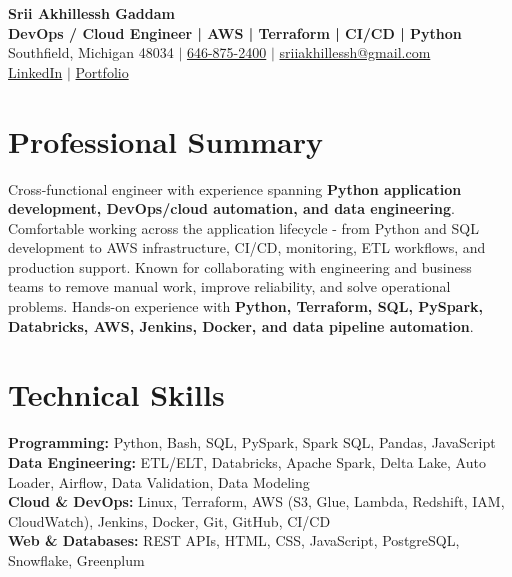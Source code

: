 \documentclass[letterpaper,10pt]{article}
\begin{document}
\fontsize{9.35pt}{10.45pt}\selectfont

\begin{center}
    {\LARGE \textbf{Srii Akhillessh Gaddam}} \\[-1pt]
    \textbf{DevOps / Cloud Engineer | AWS | Terraform | CI/CD | Python} \\[2pt]
    Southfield, Michigan 48034 $|$
    \href{tel:6468752400}{646-875-2400} $|$
    \href{mailto:sriiakhillessh@gmail.com}{sriiakhillessh@gmail.com} \\[1pt]
    \href{https://www.linkedin.com/in/srii-akhiilessh-gaddam-b48668191/}{LinkedIn} $|$
    \href{https://sriiakhillesshg.github.io/portfolio/}{Portfolio}
\end{center}
\vspace{-8pt}

\section{Professional Summary}
\small{Cross-functional engineer with experience spanning \textbf{Python application development, DevOps/cloud automation, and data engineering}. Comfortable working across the application lifecycle - from Python and SQL development to AWS infrastructure, CI/CD, monitoring, ETL workflows, and production support. Known for collaborating with engineering and business teams to remove manual work, improve reliability, and solve operational problems. Hands-on experience with \textbf{Python, Terraform, SQL, PySpark, Databricks, AWS, Jenkins, Docker, and data pipeline automation}.}

\section{Technical Skills}
\small{
\textbf{Programming:} Python, Bash, SQL, PySpark, Spark SQL, Pandas, JavaScript \\
\textbf{Data Engineering:} ETL/ELT, Databricks, Apache Spark, Delta Lake, Auto Loader, Airflow, Data Validation, Data Modeling \\
\textbf{Cloud \& DevOps:} Linux, Terraform, AWS (S3, Glue, Lambda, Redshift, IAM, CloudWatch), Jenkins, Docker, Git, GitHub, CI/CD \\
\textbf{Web \& Databases:} REST APIs, HTML, CSS, JavaScript, PostgreSQL, Snowflake, Greenplum
}
\end{document}
